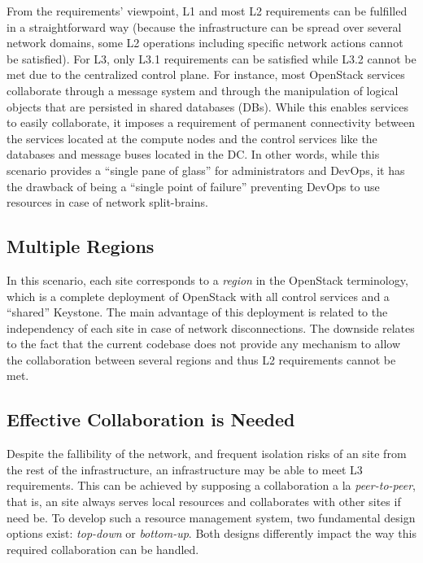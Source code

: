 From the requirements' viewpoint, L1 and most L2 requirements can be
fulfilled in a straightforward way (because the infrastructure can be
spread over several network domains, some L2 operations including
specific network actions cannot be satisfied). For L3, only L3.1
requirements can be satisfied while L3.2 cannot be met due to
the centralized control plane.
For instance, most OpenStack services collaborate through a message system and
through the manipulation of logical objects that are persisted in shared
databases (DBs). While this enables services to easily collaborate, it imposes
a requirement of permanent connectivity between the services located at the
compute nodes and the control services like the databases and message buses
located in the DC.
In other words, while this scenario provides a ``single pane of
glass'' for administrators and DevOps, it has the drawback of being a ``single
point of failure'' preventing DevOps to use \edge resources in case of network
split-brains.

\vspace*{-.2cm}
\subsection{Multiple Regions}
In this scenario, each \edge site corresponds to a \emph{region}
in the OpenStack terminology, which is a complete deployment of
OpenStack with all control services and a ``shared'' Keystone.
The main advantage of this deployment is related to the independency
of each site in case of network disconnections.
The downside relates to the fact that the current codebase does not
provide any mechanism to allow the collaboration between several
regions and thus L2 requirements cannot be met.~


\vspace*{-.1cm}
\subsection{Effective Collaboration is Needed}
Despite the fallibility of the network, and frequent isolation risks
of an \edge site from the rest of the infrastructure, an \edge
infrastructure may be able to meet L3 requirements. This can be
achieved by supposing a collaboration a la \emph{peer-to-peer},
that is, an \edge site always serves local resources and collaborates
with other \edge sites if need be. To develop such a resource
management system, two fundamental design options exist:
\emph{top-down} or \emph{bottom-up}. Both designs differently impact the way
this required collaboration can be handled.

